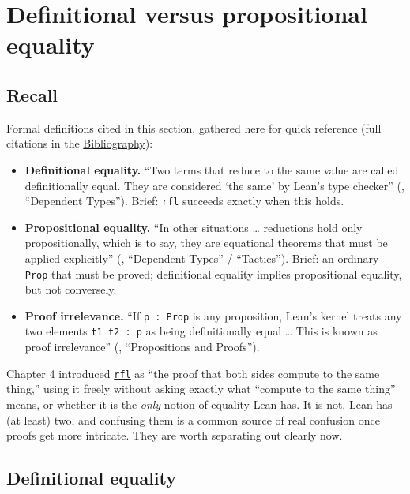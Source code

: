 \section{Definitional versus propositional equality}\label{sec:05-rigor-check:04-defeq-vs-propeq:1}

\subsection{Recall}\label{sec:05-rigor-check:04-defeq-vs-propeq:2}

Formal definitions cited in this section, gathered here for quick reference (full citations in the \hyperref[sec:root:bibliography:1]{Bibliography}):

\begin{itemize}
\tightlist
\item
  \textbf{Definitional equality.} ``Two terms that reduce to the same value are called definitionally equal. They are considered `the same' by Lean's type checker'' (\cite{TPIL4}, ``Dependent Types''). Brief: \texttt{rfl} succeeds exactly when this holds.
\item
  \textbf{Propositional equality.} ``In other situations \ldots{} reductions hold only propositionally, which is to say, they are equational theorems that must be applied explicitly'' (\cite{TPIL4}, ``Dependent Types'' / ``Tactics''). Brief: an ordinary \texttt{Prop} that must be proved; definitional equality implies propositional equality, but not conversely.
\item
  \textbf{Proof irrelevance.} ``If \texttt{p : Prop} is any proposition, Lean's kernel treats any two elements \texttt{t1 t2 : p} as being definitionally equal \ldots{} This is known as proof irrelevance'' (\cite{TPIL4}, ``Propositions and Proofs'').
\end{itemize}

Chapter 4 introduced \href{https://lean-lang.org/doc/reference/latest/Tactic-Proofs/Tactic-Reference/}{\texttt{rfl}} as ``the proof that both sides compute to the same thing,'' using it freely without asking exactly what ``compute to the same thing'' means, or whether it is the \emph{only} notion of equality Lean has. It is not. Lean has (at least) two, and confusing them is a common source of real confusion once proofs get more intricate. They are worth separating out clearly now.

\subsection{Definitional equality}\label{sec:05-rigor-check:04-defeq-vs-propeq:3}


